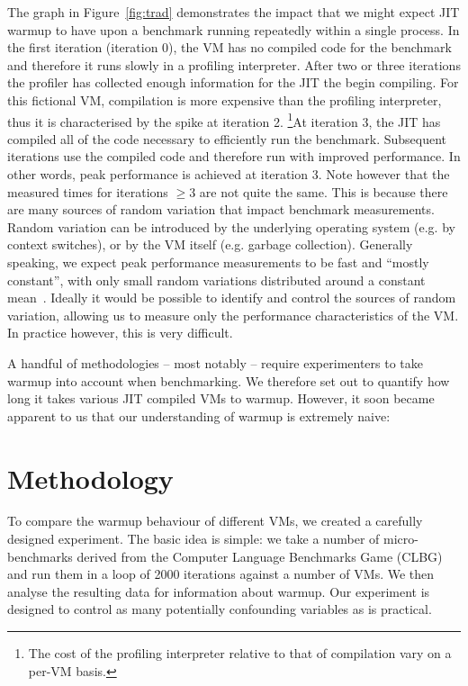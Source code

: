 \documentclass[10pt,preprint]{sigplanconf}
\begin{document}
The graph in Figure~\ref{fig:trad} demonstrates the impact that we might
expect JIT warmup to have upon a benchmark running repeatedly within a
single process. In the first iteration (iteration 0), the VM has no compiled
code for the benchmark and therefore it runs slowly in a profiling
interpreter. After two or three iterations the profiler has collected enough
information for the JIT the begin compiling. For this fictional VM,
compilation is more expensive than the profiling interpreter, thus it is
characterised by the spike at iteration 2. \footnote{The cost of
the profiling interpreter relative to that of compilation vary on a per-VM
basis.}At iteration 3, the JIT has compiled all of the code necessary to
efficiently run the benchmark. Subsequent iterations use the compiled code
and therefore run with improved performance. In other words, peak
performance is achieved at iteration 3. Note however that the measured times
for iterations $\geq 3$ are not quite the same. This is because there are many
sources of random variation that impact benchmark measurements. Random
variation can be introduced by the underlying operating system (e.g. by
context switches), or by the VM itself (e.g. garbage collection).  Generally
speaking, we expect peak performance measurements to be fast and ``mostly
constant'', with only small random variations distributed around a constant
mean~\cite{XXX}.  Ideally it would be possible to identify and control the
sources of random variation, allowing us to measure only the performance
characteristics of the VM. In practice however, this is very difficult.

A handful of methodologies -- most notably
\cite{kalibera12quantifying,kalibera13rigorous} -- require experimenters to take
warmup into account when benchmarking. We therefore set out to quantify how long
it takes various JIT compiled VMs to warmup. However, it soon became apparent to
us that our understanding of warmup is extremely naive:


\section{Methodology}
\label{sec:methodology}

To compare the warmup behaviour of different VMs, we created a carefully
designed experiment. The basic idea is simple: we take a number of
micro-benchmarks derived from the Computer Language Benchmarks Game (CLBG) and
run them in a loop of 2000 iterations against a number of VMs. We then analyse
the resulting data for information about warmup. Our experiment is designed to
control as many potentially confounding variables as is practical.
\end{document}
